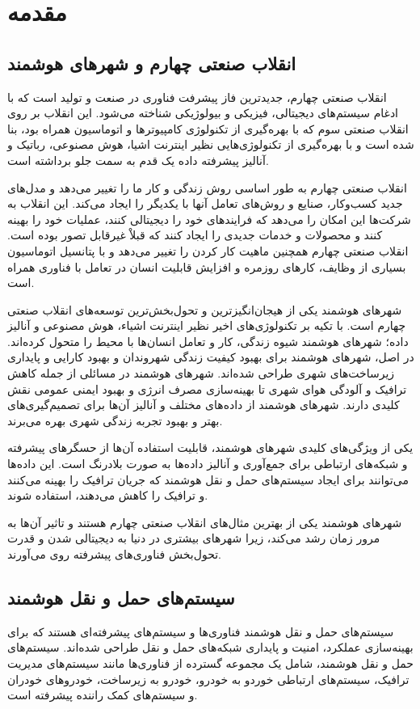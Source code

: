 \chapter{مقدمه}
\section{انقلاب صنعتی چهارم و شهر‌های هوشمند}
انقلاب صنعتی چهارم، جدیدترین فاز پیشرفت فناوری در صنعت و تولید است که با ادغام سیستم‌های دیجیتالی، فیزیکی و بیولوژیکی شناخته می‌شود. این انقلاب بر روی انقلاب صنعتی سوم که با بهره‌گیری از تکنولوژی کامپیوتر‌ها و اتوماسیون همراه بود، بنا شده است و با بهره‌گیری از تکنولوژی‌هایی نظیر اینترنت اشیا، هوش مصنوعی، رباتیک و آنالیز پیشرفته داده یک قدم به سمت جلو برداشته است.

انقلاب صنعتی چهارم به طور اساسی روش زندگی و کار ما را تغییر می‌دهد و مدل‌های جدید کسب‌و‌کار، صنایع و روش‌های تعامل آنها با یکدیگر را ایجاد می‌کند. این انقلاب به شرکت‌ها این امکان را می‌دهد که فرایند‌های خود را دیجیتالی کنند، عملیات خود را بهینه کنند و محصولات و خدمات جدیدی را ایجاد کنند که قبلاْ غیر‌قابل تصور بوده است. انقلاب صنعتی چهارم همچنین ماهیت کار کردن را تغییر می‌دهد و با پتانسیل اتوماسیون بسیاری از وظایف، کارهای روزمره و افزایش قابلیت انسان در تعامل با فناوری همراه است.

شهر‌های هوشمند یکی از هیجان‌انگیزترین و تحول‌بخش‌ترین توسعه‌های انقلاب صنعتی چهارم است. با تکیه بر تکنولوژی‌های اخیر نظیر اینترنت اشیاء، هوش مصنوعی و آنالیز داده؛ شهرهای هوشمند شیوه زندگی، کار و تعامل انسان‌ها با محیط را متحول کرده‌اند. در اصل، شهرهای هوشمند برای بهبود کیفیت زندگی شهروندان و بهبود کارایی و پایداری زیرساخت‌های شهری طراحی شده‌اند. شهرهای هوشمند در مسائلی از جمله کاهش ترافیک و آلودگی هوای شهری تا بهینه‌سازی مصرف انرژی و بهبود ایمنی عمومی نقش کلیدی دارند. شهر‌های هوشمند از داده‌های مختلف و آنالیز آن‌ها برای تصمیم‌گیری‌های بهتر و بهبود تجربه زندگی شهری بهره می‌برند.

یکی از ویژگی‌های کلیدی شهرهای هوشمند، قابلیت استفاده آن‌ها از حسگرهای پیشرفته و شبکه‌های ارتباطی برای جمع‌آوری و آنالیز داده‌ها به صورت بلادرنگ است. این داده‌ها می‌توانند برای ایجاد سیستم‌های حمل‌ و نقل هوشمند که جریان ترافیک را بهینه‌ می‌کنند و ترافیک را کاهش می‌دهند، استفاده شوند.

شهرهای هوشمند یکی از بهترین‌ مثال‌های انقلاب صنعتی چهارم هستند و تاثیر آن‌ها به مرور زمان رشد می‌کند، زیرا شهر‌های بیشتری در دنیا به دیجیتالی شدن و قدرت‌ تحول‌بخش فناوری‌های پیشرفته روی می‌آورند.
\section{سیستم‌های حمل و نقل هوشمند}
سیستم‌های حمل ‌و نقل هوشمند فناوری‌ها و سیستم‌های پیشرفته‌ای هستند که برای بهینه‌سازی عملکرد، امنیت و پایداری شبکه‌های حمل و نقل طراحی شده‌اند. سیستم‌های حمل و نقل هوشمند، شامل یک مجموعه گسترده از فناوری‌ها مانند سیستم‌های مدیریت ترافیک، سیستم‌های ارتباطی خوردو به خودرو، خودرو به زیرساخت، خودرو‌های خودران و سیستم‌های کمک راننده پیشرفته است.

